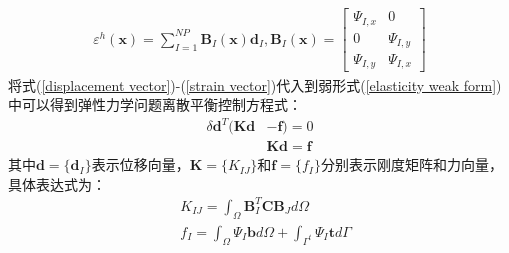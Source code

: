 \begin{equation}\label{strain vector}
\begin{split}
    \varepsilon^h(\pmb{x})=\sum_{I=1}^{N\!P}\pmb{B}_I(\pmb{x})\pmb{d}_I,\pmb{B}_I(\pmb{x})= \left[\begin{matrix}\Psi_{I,x}&0\\0&\Psi_{I,y}\\\Psi_{I,y}&\Psi_{I,x} \end{matrix}\right] 
\end{split}
\end{equation}
将式(\ref{displacement vector})-(\ref{strain vector})代入到弱形式(\ref{elasticity weak form})中可以得到弹性力学问题离散平衡控制方程式：
\begin{equation}
\begin{split}
    \delta\pmb{d}^T(\pmb{K}\pmb{d}&-\pmb{f})=0\\
    &\pmb{K}\pmb{d}=\pmb{f}
\end{split}
\end{equation}
其中$\pmb{d}=\{\pmb d_I\}$表示位移向量，$\pmb{K}=\{K_{I\!J}\}$和$\pmb{f}=\{f_I\}$分别表示刚度矩阵和力向量，具体表达式为：
\begin{equation}
\begin{split}\label{EKf}
        &K_{I\!J}=\int_{\Omega}\pmb{B}_I^T\pmb{C}\pmb{B}_Jd\Omega\\
        &f_I=\int_{\Omega}\Psi_I\pmb{b}d\Omega+\int_{\Gamma^t}\Psi_I\pmb{t}d\Gamma
\end{split}
\end{equation}
